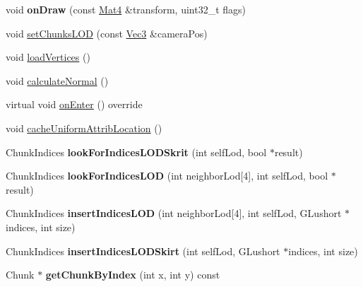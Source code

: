 \begin{DoxyCompactItemize}
\item 
\mbox{\label{classTerrain_a83eddb26eec75d0698944f2518031280}} 
void {\bfseries on\+Draw} (const \hyperlink{classMat4}{Mat4} \&transform, uint32\+\_\+t flags)
\item 
void \hyperlink{classTerrain_ab2a8b176050b693a801f5a73f1d3b6e0}{set\+Chunks\+L\+OD} (const \hyperlink{classVec3}{Vec3} \&camera\+Pos)
\item 
void \hyperlink{classTerrain_aac8d9ca975f6b0050c49f7cb3c2f37ad}{load\+Vertices} ()
\item 
void \hyperlink{classTerrain_a04237c044acd2918422e7654e18cd89b}{calculate\+Normal} ()
\item 
virtual void \hyperlink{classTerrain_a1d3c0deb9503e340a9818c8cf8c61923}{on\+Enter} () override
\item 
void \hyperlink{classTerrain_a33ce1e6fa0fff42e42f510d29553e015}{cache\+Uniform\+Attrib\+Location} ()
\item 
\mbox{\label{classTerrain_a09a299a65c2a88a69ed5ed7a85932c1b}} 
Chunk\+Indices {\bfseries look\+For\+Indices\+L\+O\+D\+Skrit} (int self\+Lod, bool $\ast$result)
\item 
\mbox{\label{classTerrain_a35b6b43de1b816fd32cc307913a5c5b1}} 
Chunk\+Indices {\bfseries look\+For\+Indices\+L\+OD} (int neighbor\+Lod\mbox{[}4\mbox{]}, int self\+Lod, bool $\ast$result)
\item 
\mbox{\label{classTerrain_abc87777efb8458de0f9d691f2a67d72a}} 
Chunk\+Indices {\bfseries insert\+Indices\+L\+OD} (int neighbor\+Lod\mbox{[}4\mbox{]}, int self\+Lod, G\+Lushort $\ast$indices, int size)
\item 
\mbox{\label{classTerrain_a29a555ab33b78185afb4e62c0e78a615}} 
Chunk\+Indices {\bfseries insert\+Indices\+L\+O\+D\+Skirt} (int self\+Lod, G\+Lushort $\ast$indices, int size)
\item 
\mbox{\label{classTerrain_ad31ac69db26be642fd3d53e12e221282}} 
Chunk $\ast$ {\bfseries get\+Chunk\+By\+Index} (int x, int y) const
\end{DoxyCompactItemize}
